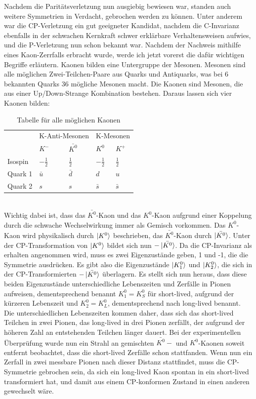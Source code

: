 \documentclass[12pt,a4paper]{scrartcl}
\numberwithin{equation}{section}
\begin{document}
Nachdem die Paritätsverletzung nun ausgiebig bewiesen war, standen auch weitere Symmetrien in Verdacht, gebrochen werden zu können. Unter anderem war die CP-Verletzung ein gut geeigneter Kandidat, nachdem die C-Invarianz ebenfalls in der schwachen Kernkraft schwer erklärbare Verhaltensweisen aufwies, und die P-Verletzung nun schon bekannt war. Nachdem der Nachweis mithilfe eines Kaon-Zerrfalls erbracht wurde, werde ich jetzt vorerst die dafür wichtigen Begriffe erläutern. Kaonen bilden eine Untergruppe der Mesonen. Mesonen sind alle möglichen Zwei-Teilchen-Paare aus Quarks und Antiquarks, was bei 6 bekannten Quarks 36 mögliche Mesonen macht. Die Kaonen sind Mesonen, die aus einer Up/Down-Strange Kombination bestehen. Daraus lassen sich vier Kaonen bilden:
\begin{table}[!ht]
\centering
\begin{tabular}{lllll}
        & \multicolumn{2}{l}{K-Anti-Mesonen} & \multicolumn{2}{l}{K-Mesonen}      \\
        & $K^{-}$       & $\bar{K^{0}}$ & $K^{0}$       & $K^{+}$       \\
Isospin & $-\frac{1}{2}$& $\frac{1}{2}$ & $-\frac{1}{2}$& $\frac{1}{2}$ \\
Quark 1 & $\bar{u}$     & $\bar{d}$     & $d$           & $u$           \\
Quark 2 & $s$           & $s$           & $\bar{s}$     & $\bar{s}$
\end{tabular}
\caption{Tabelle für alle möglichen Kaonen}
\end{table} \\
Wichtig dabei ist, dass das $\bar{K^{0}}$-Kaon und das $K^{0}$-Kaon aufgrund einer Koppelung durch die schwache Wechselwirkung immer als Gemisch vorkommen. Das $K^{0}$-Kaon wird physikalisch durch $\ket{K^{0}}$ beschrieben, das $\bar{K^{0}}$-Kaon durch $\ket{\bar{K^{0}}}$. Unter der CP-Transformation von $\ket{K^{0}}$ bildet sich nun $-\ket{\bar{K^{0}}}$.\cite{yukawa35, tanabashi18} Da die CP-Invarianz als erhalten angenommen wird, muss es zwei Eigenzustände geben, 1 und -1, die die Symmetrie ausdrücken. Es gibt also die Eigenzustände $\ket{K^{0}_{1}}$ und $\ket{K^{0}_{2}}$, die sich in der CP-Transformierten $-\ket{\bar{K^{0}}}$ überlagern. Es stellt sich nun heraus, dass diese beiden Eigenzustände unterschiedliche Lebenszeiten und Zerfälle in Pionen aufweisen, dementsprechend benannt $K^{0}_{1} = K^{0}_{S}$ für short-lived, aufgrund der kürzeren Lebenszeit und $K^{0}_{2} = K^{0}_{L}$, dementsprechend nach long-lived benannt. Die unterschiedlichen Lebenszeiten kommen daher, dass sich das short-lived Teilchen in zwei Pionen, das long-lived in drei Pionen zerfällt, der aufgrund der höheren Zahl an entstehenden Teilchen länger dauert. Bei der experimentellen Überprüfung wurde nun ein Strahl an gemischten $\bar{K^{0}}-$ und $K^{0}$-Kaonen soweit entfernt beobachtet, dass die short-lived Zerfälle schon stattfanden. Wenn nun ein Zerfall in zwei messbare Pionen nach dieser Distanz stattfindet, muss die CP-Symmetrie gebrochen sein, da sich ein long-lived Kaon spontan in ein short-lived transformiert hat, und damit aus einem CP-konformen Zustand in einen anderen gewechselt wäre.\cite{coleman08, lion15} \\
\end{document}
